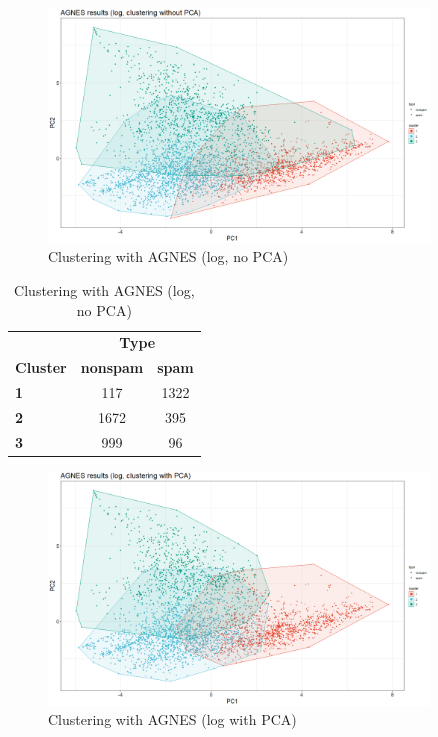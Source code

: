 \documentclass{article}
\begin{document}
	\begin{figure}[h]
		\centering
		\includegraphics[width=0.9\textwidth]{proj2_plots/agnes_res_log.png}
		\caption{Clustering with AGNES (log, no PCA)}
		\label{fig::clust_agnes_log}
	\end{figure}
	
	\begin{table}[h]
		\centering
		\begin{tabular}{lcc}
			& \multicolumn{2}{c}{\textbf{Type}} \\
			\textbf{Cluster} & \textbf{nonspam} & \textbf{spam} \\
			\textbf{1} & 117 & 1322 \\
			\textbf{2} & 1672 & 395 \\
			\textbf{3} & 999 & 96 \\
		\end{tabular}
		\caption{Clustering with AGNES (log, no PCA)}
		\label{tab::clust_agnes_log}
	\end{table}
	
	\begin{figure}[h]
		\centering
		\includegraphics[width=0.9\textwidth]{proj2_plots/agnes_res_log_pca.png}
		\caption{Clustering with AGNES (log with PCA)}
		\label{fig::clust_agnes_log_pca}
	\end{figure}
	
\end{document}
